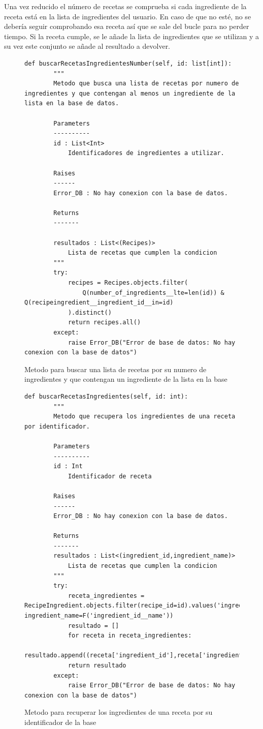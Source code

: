 Una vez reducido el número de recetas se comprueba si cada ingrediente de la receta está en la lista de ingredientes del usuario. En caso de que no esté, no se debería seguir comprobando esa receta así que se sale del bucle para no perder tiempo. Si la receta cumple, se le añade la lista de ingredientes que se utilizan y a su vez este conjunto se añade al resultado a devolver.
\begin{figure}[H]
    \begin{lstlisting}[style=python]
        def buscarRecetasIngredientesNumber(self, id: list[int]):
        """
        Metodo que busca una lista de recetas por numero de ingredientes y que contengan al menos un ingrediente de la lista en la base de datos.

        Parameters
        ----------
        id : List<Int>
            Identificadores de ingredientes a utilizar.

        Raises
        ------
        Error_DB : No hay conexion con la base de datos.

        Returns
        -------
            
        resultados : List<(Recipes)>
            Lista de recetas que cumplen la condicion
        """
        try:
            recipes = Recipes.objects.filter(
                Q(number_of_ingredients__lte=len(id)) & Q(recipeingredient__ingredient_id__in=id)
            ).distinct()
            return recipes.all()
        except:
            raise Error_DB("Error de base de datos: No hay conexion con la base de datos")
    \end{lstlisting}
    \caption{Metodo para buscar una lista de recetas por su numero de ingredientes y que contengan un ingrediente de la lista en la \gls{base}}
    \label{sni:buscarRecetaNumeroIngredientes}
\end{figure}
\begin{figure}[H]
    \begin{lstlisting}[style=python]
        def buscarRecetasIngredientes(self, id: int):
        """
        Metodo que recupera los ingredientes de una receta por identificador.

        Parameters
        ----------
        id : Int
            Identificador de receta

        Raises
        ------
        Error_DB : No hay conexion con la base de datos.

        Returns
        -------
        resultados : List<(ingredient_id,ingredient_name)>
            Lista de recetas que cumplen la condicion
        """
        try:
            receta_ingredientes = RecipeIngredient.objects.filter(recipe_id=id).values('ingredient_id', ingredient_name=F('ingredient_id__name'))
            resultado = []
            for receta in receta_ingredientes:
                resultado.append((receta['ingredient_id'],receta['ingredient_name']))
            return resultado
        except:
            raise Error_DB("Error de base de datos: No hay conexion con la base de datos")
    \end{lstlisting}
    \caption{Metodo para recuperar los ingredientes de una receta por su identificador de la \gls{base}}
    \label{sni:buscarRecetaIDIngredientes}
\end{figure}